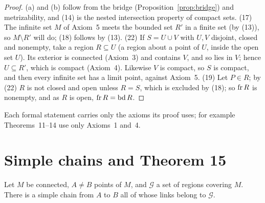 \begin{proof}
(a) and (b) follow from the bridge (Proposition~\ref{prop:bridge}) and metrizability, and (14) is the
nested intersection property of compact sets.
(17) The infinite set $M$ of Axiom~5 meets the bounded set $R'$ in a finite set (by (13)), so $M\setminus
R'$ will do; (18) follows by (13).
(22) If $S=U\cup V$ with $U,V$ disjoint, closed and nonempty, take a region $R\subseteq U$ (a region about a
point of $U$, inside the open set $U$). Its exterior is connected (Axiom~3) and contains $V$, and so lies in
$V$; hence $U\subseteq R'$, which is compact (Axiom~4). Likewise $V$ is compact, so $S$ is compact, and
then every infinite set has a limit point, against Axiom~5.
(19) Let $P\in R$; by (22) $R$ is not closed and open unless $R=S$, which is excluded by (18); so $\operatorname{fr} R$ is
nonempty, and as $R$ is open, $\operatorname{fr} R=\operatorname{bd} R$.
\end{proof}


Each formal statement carries only the axioms its proof uses; for example Theorems~11--14 use only
Axioms~1 and~4.

\section{Simple chains and Theorem 15}

\begin{theorem}[F.A.\ Theorem~10]\label{thm:fa10}
Let $M$ be connected, $A\ne B$ points of $M$, and $\mathcal G$ a set of regions covering $M$. There is a
simple chain from $A$ to $B$ all of whose links belong to $\mathcal G$.
\end{theorem}

